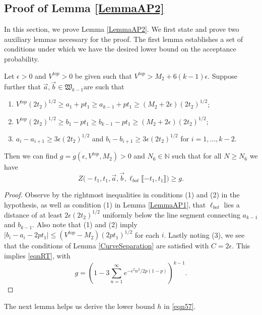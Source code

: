 \subsection{Proof of Lemma \ref{LemmaAP2}} \label{sect62} In this section, we prove Lemma \ref{LemmaAP2}. We first state and prove two auxiliary lemmas necessary for the proof. The first lemma establishes a set of conditions under which we have the desired lower bound on the acceptance probability. 

\begin{lemma}\label{LemmaBP1} Let $\epsilon > 0$ and $V^{top} > 0$ be given such that $V^{top} > M_2 + 6 (k-1) \epsilon$. Suppose further that $\vec{a}, \vec{b} \in \mathfrak{W}_{k-1}$are such that 
	\begin{enumerate}
		\item $V^{top} (2t_2)^{1/2} \geq a_1 + p t_1 \geq a_{k-1} + pt_1 \geq (M_2 + 2 \epsilon) (2t_2)^{1/2}$;
		\item $V^{top} (2t_2)^{1/2} \geq b_1 - p t_1 \geq b_{k-1} - pt_1 \geq (M_2 + 2 \epsilon) (2t_2)^{1/2}$; 
		\item $a_i -a_{i+1} \geq 3\epsilon (2t_2)^{1/2}$ and $b_{i} - b_{i+1} \geq 3 \epsilon (2t_2)^{1/2}$ for $i = 1, \dots, k-2$.
	\end{enumerate}
	Then we can find $g = g(\epsilon, V^{top}, M_2) > 0$ and $N_6 \in \mathbb{N}$ such that for all $N \geq N_6$ we have 
	\begin{equation}\label{eqnRT}
	Z\big(  -t_1, t_1, \vec{a} ,\vec{b}, \ell_{bot}\llbracket -t_1, t_1\rrbracket\big) \geq g.
	\end{equation}
\end{lemma}

\begin{proof}
	
	Observe by the rightmost inequalities in conditions (1) and (2) in the hypothesis, as well as condition (1) in Lemma \ref{LemmaAP1}, that $\ell_{bot}$ lies a distance of at least $2\epsilon(2t_2)^{1/2}$ uniformly below the line segment connecting $a_{k-1}$ and $b_{k-1}$. Also note that (1) and (2) imply $|b_i-a_i-2pt_1| \leq (V^{top} - M_2)(2pt_1)^{1/2}$ for each $i$. Lastly noting (3), we see that the conditions of Lemma \ref{CurveSeparation} are satisfied with $C = 2\epsilon$. This implies \eqref{eqnRT}, with
	\[
	g = \left( 1 - 3\sum_{n=1}^\infty e^{-\epsilon^2n^2/2p(1-p)}\right)^{k-1}.
	\]
	
\end{proof}

\noindent The next lemma helps us derive the lower bound $h$ in \eqref{eqn57}.

